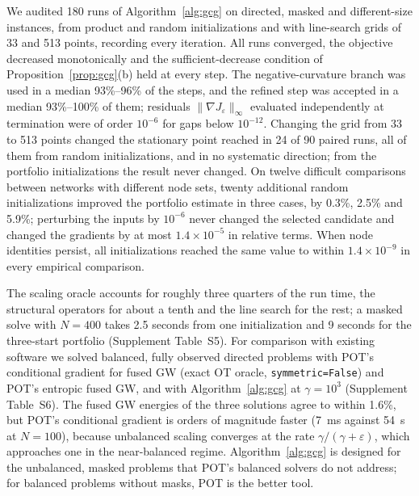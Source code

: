 \documentclass[12pt]{article}
\theoremstyle{definition}
\begin{document}
We audited 180 runs of Algorithm~\ref{alg:gcg} on directed, masked and different-size instances, from product and random initializations and with line-search grids of 33 and 513 points, recording every iteration. All runs converged, the objective decreased monotonically and the sufficient-decrease condition of Proposition~\ref{prop:gcg}(b) held at every step. The negative-curvature branch was used in a median 93\%--96\% of the steps, and the refined step was accepted in a median 93\%--100\% of them; residuals $\|\nabla J_\varepsilon\|_\infty$ evaluated independently at termination were of order $10^{-6}$ for gaps below $10^{-12}$. Changing the grid from 33 to 513 points changed the stationary point reached in 24 of 90 paired runs, all of them from random initializations, and in no systematic direction; from the portfolio initializations the result never changed. On twelve difficult comparisons between networks with different node sets, twenty additional random initializations improved the portfolio estimate in three cases, by 0.3\%, 2.5\% and 5.9\%; perturbing the inputs by $10^{-6}$ never changed the selected candidate and changed the gradients by at most $1.4\times10^{-5}$ in relative terms. When node identities persist, all initializations reached the same value to within $1.4\times10^{-9}$ in every empirical comparison.

The scaling oracle accounts for roughly three quarters of the run time, the structural operators for about a tenth and the line search for the rest; a masked solve with $N=400$ takes 2.5 seconds from one initialization and 9 seconds for the three-start portfolio (Supplement Table~S5). For comparison with existing software we solved balanced, fully observed directed problems with POT's conditional gradient for fused GW (exact OT oracle, \texttt{symmetric=False}) and POT's entropic fused GW, and with Algorithm~\ref{alg:gcg} at $\gamma=10^3$ (Supplement Table~S6). The fused GW energies of the three solutions agree to within 1.6\%, but POT's conditional gradient is orders of magnitude faster (7~ms against 54~s at $N=100$), because unbalanced scaling converges at the rate $\gamma/(\gamma+\varepsilon)$, which approaches one in the near-balanced regime. Algorithm~\ref{alg:gcg} is designed for the unbalanced, masked problems that POT's balanced solvers do not address; for balanced problems without masks, POT is the better tool.
\end{document}
